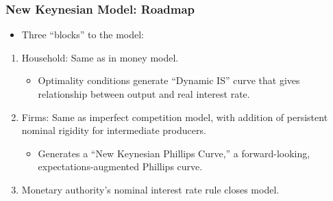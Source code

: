 \documentclass[english,xcolor=svgnames]{beamer}
\begin{document}



\begin{frame}
\frametitle{New Keynesian Model: Roadmap}
\begin{itemize}
	\item Three ``blocks'' to the model:
\end{itemize}
\begin{enumerate}[1.]
	\item Household: Same as in money model.
	\begin{itemize}
		\item Optimality conditions generate ``Dynamic IS'' curve that gives relationship between output and real interest rate.
	\end{itemize}
	\item Firms: Same as imperfect competition model, with addition of persistent nominal rigidity for intermediate producers.
	\begin{itemize}
		\item Generates a ``New Keynesian Phillips Curve,'' a forward-looking, expectations-augmented Phillips curve.
	\end{itemize}
	\item Monetary authority's nominal interest rate rule closes model.
\end{enumerate}
\end{frame}
\end{document}
